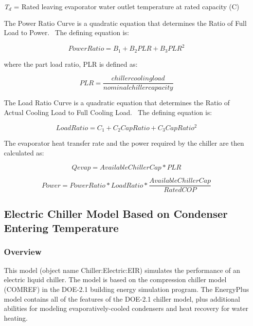 \emph{T\(_{d}\)} = Rated leaving evaporator water outlet temperature at rated capacity (C)

The Power Ratio Curve is a quadratic equation that determines the Ratio of Full Load to Power.~ The defining equation is:

\begin{equation}
PowerRatio = {B_1} + {B_2}PLR + {B_3}PL{R^2}
\end{equation}

where the part load ratio, PLR is defined as:

\begin{equation}
PLR = \frac{{chiller cooling load}}{{nominal chiller capacity}}
\end{equation}

The Load Ratio Curve is a quadratic equation that determines the Ratio of Actual Cooling Load to Full Cooling Load.~ The defining equation is:

\begin{equation}
LoadRatio = {C_1} + {C_2}CapRatio + {C_3}CapRati{o^2}
\end{equation}

The evaporator heat transfer rate and the power required by the chiller are then calculated as:

\begin{equation}
Qevap = AvailableChillerCap*PLR
\end{equation}

\begin{equation}
Power = PowerRatio*LoadRatio*\frac{{AvailableChillerCap}}{{RatedCOP}}
\end{equation}

\subsection{Electric Chiller Model Based on Condenser Entering Temperature}\label{electric-chiller-model-based-on-condenser-entering-temperature}

\subsubsection{Overview}\label{overview-2-003}

This model (object name Chiller:Electric:EIR) simulates the performance of an electric liquid chiller. The model is based on the compression chiller model (COMREF) in the DOE-2.1 building energy simulation program. The EnergyPlus model contains all of the features of the DOE-2.1 chiller model, plus additional abilities for modeling evaporatively-cooled condensers and heat recovery for water heating.

